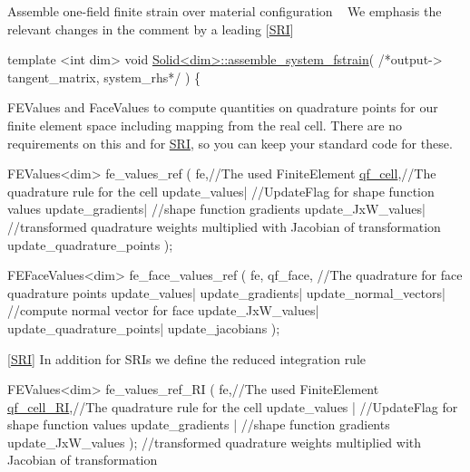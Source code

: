  Assemble one-\/field finite strain over material configuration ~\newline
We emphasis the relevant changes in the comment by a leading \mbox{[}\hyperlink{namespaceSRI}{S\+RI}\mbox{]} 
\begin{DoxyCode}
\textcolor{keyword}{template} <\textcolor{keywordtype}{int} dim>
\textcolor{keywordtype}{void} \hyperlink{classSolid}{Solid<dim>::assemble\_system\_fstrain}( \textcolor{comment}{/*output-> tangent\_matrix,
       system\_rhs*/} )
\{
\end{DoxyCode}
 F\+E\+Values and Face\+Values to compute quantities on quadrature points for our finite element space including mapping from the real cell. There are no requirements on this {\itshape }  and  for \hyperlink{namespaceSRI}{S\+RI}, so you can keep your standard code for these. 
\begin{DoxyCode}
FEValues<dim> fe\_values\_ref (  fe,\textcolor{comment}{//The used FiniteElement}
                               \hyperlink{assembly__routine__SRI_8cc_aaaceb34a5b42a4954b2e893607c1bdef}{qf\_cell},\textcolor{comment}{//The quadrature rule for the cell}
                               update\_values| \textcolor{comment}{//UpdateFlag for shape function values}
                               update\_gradients| \textcolor{comment}{//shape function gradients}
                               update\_JxW\_values|  \textcolor{comment}{//transformed quadrature weights multiplied with
       Jacobian of transformation}
                               update\_quadrature\_points );

FEFaceValues<dim> fe\_face\_values\_ref ( fe,
                                       qf\_face, \textcolor{comment}{//The quadrature for face quadrature points}
                                       update\_values|
                                       update\_gradients|
                                       update\_normal\_vectors| \textcolor{comment}{//compute normal vector for face}
                                       update\_JxW\_values|
                                       update\_quadrature\_points|
                                       update\_jacobians );
\end{DoxyCode}
 \mbox{[}\hyperlink{namespaceSRI}{S\+RI}\mbox{]} In addition for S\+R\+Is we define the reduced integration rule 
\begin{DoxyCode}
FEValues<dim> fe\_values\_ref\_RI (   fe,\textcolor{comment}{//The used FiniteElement}
                                   \hyperlink{assembly__routine__SRI_8cc_ab9727a7376e2656d3cd40c65ac7efb81}{qf\_cell\_RI},\textcolor{comment}{//The quadrature rule for the cell}
                                   update\_values | \textcolor{comment}{//UpdateFlag for shape function values}
                                   update\_gradients | \textcolor{comment}{//shape function gradients}
                                   update\_JxW\_values );  \textcolor{comment}{//transformed quadrature weights multiplied with
       Jacobian of transformation}
\end{DoxyCode}

